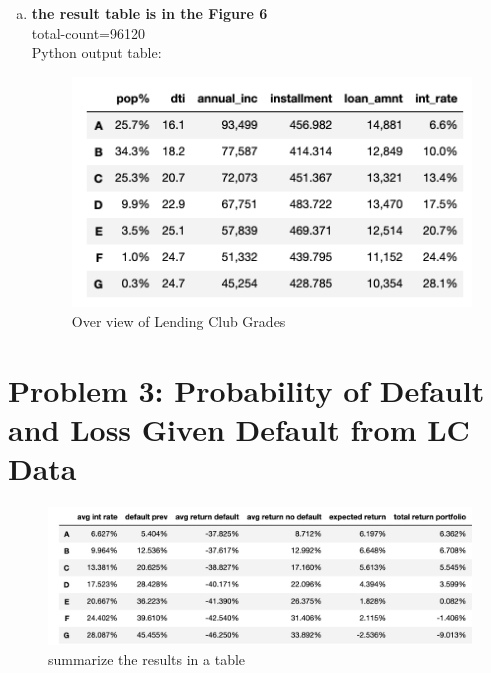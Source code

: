 \documentclass{article}
\begin{document}
\begin{enumerate}[(a)]
  \item 
  \textbf{the result table is in the Figure 6}\\
  total-count=96120\\
   Python output table:
  \begin{figure}[h!]
    \centering
    \includegraphics[scale=0.50]{OverviewofLendingClubGrades}
    \caption{Over view of Lending Club Grades}
    \label{fig:original fico_hist}
    \end{figure}


 \end{enumerate}
 
\newpage
\section*{Problem 3: Probability of Default and Loss Given Default from LC Data}
  \begin{figure}[h!]
    \centering
    \includegraphics[scale=0.50]{STATs}
    \caption{summarize the results in a table}
    \label{fig:original fico_hist}
    \end{figure}
\end{document}
